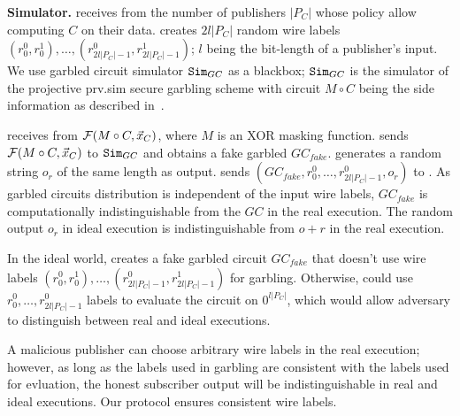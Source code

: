 \noindent\textbf{Simulator.} \Sim receives from \F the number of publishers
$|P_C|$ whose policy allow computing $C$ on their data. \Sim creates $2l|P_C|$
random wire labels $(r_0^0, r_0^1), \ldots, (r_{2l|P_C|-1}^0
,r_{2l|P_C|-1}^1)$; $l$ being the bit-length of a publisher's input. We use
garbled circuit simulator $\texttt{Sim}_{GC}$ as a blackbox; $\texttt{Sim}_{GC}$ is the
simulator of the projective prv.sim secure garbling scheme with circuit $M
\circ C$ being the side information as described in~\cite{}. 

\Sim receives from \F $\mathcal{F}(M \circ C, \vec{x}_C)$, where $M$ is an XOR masking
function. \Sim sends $\mathcal{F}(M \circ C, \vec{x}_C)$ to $\texttt{Sim}_{GC}$ and obtains a
fake garbled $GC_{fake}$. \Sim generates a random string $o_r$ of the same
length as output. \Sim sends $(GC_{fake}, r_0^0, \ldots, r_{2l|P_C|-1}^0, o_r)$
to \Adv. As garbled circuits distribution is independent of the input wire
labels, $GC_{fake}$ is computationally indistinguishable from the $GC$ in the
real execution. The random output $o_r$ in ideal execution is indistinguishable
from $o+r$ in the real execution.

In the ideal world, \Sim creates a fake garbled circuit $GC_{fake}$ that
doesn't use wire labels $(r_0^0, r_0^1), \ldots, (r_{2l|P_C|-1}^0
,r_{2l|P_C|-1}^1)$ for garbling. Otherwise, \Adv could use $r_0^0, \ldots,
r_{2l|P_C|-1}^0$ labels to evaluate the circuit on $0^{l|P_C|}$, which would
allow adversary to distinguish between real and ideal executions.

A malicious publisher can choose arbitrary wire labels in the real execution;
however, as long as the labels used in garbling are consistent with the labels
used for evluation, the honest subscriber output will be indistinguishable in
real and ideal executions. Our protocol ensures consistent wire labels.
